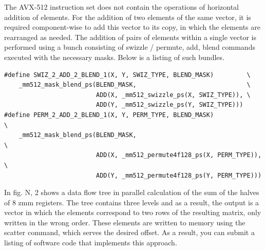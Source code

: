 \documentclass[
11pt,%
tightenlines,%
twoside,%
onecolumn,%
nofloats,%
nobibnotes,%
nofootinbib,%
superscriptaddress,%
noshowpacs,%
centertags]%
{revtex4}
\begin{document}
The AVX-512 instruction set does not contain the operations of horizontal addition of elements. For the addition of two elements of the same vector, it is required component-wise to add this vector to its copy, in which the elements are rearranged as needed. The addition of pairs of elements within a single vector is performed using a bunch consisting of swizzle / permute, add, blend commands executed with the necessary masks. Below is a listing of such bundles.

\begin{lstlisting}
#define SWIZ_2_ADD_2_BLEND_1(X, Y, SWIZ_TYPE, BLEND_MASK)         \
    _mm512_mask_blend_ps(BLEND_MASK,                              \
                         ADD(X, _mm512_swizzle_ps(X, SWIZ_TYPE)), \
                         ADD(Y, _mm512_swizzle_ps(Y, SWIZ_TYPE)))
#define PERM_2_ADD_2_BLEND_1(X, Y, PERM_TYPE, BLEND_MASK)              \
    _mm512_mask_blend_ps(BLEND_MASK,                                   \
                         ADD(X, _mm512_permute4f128_ps(X, PERM_TYPE)), \
                         ADD(Y, _mm512_permute4f128_ps(Y, PERM_TYPE)))

\end{lstlisting}

In fig. N, 2 shows a data flow tree in parallel calculation of the sum of the halves of 8 zmm registers. The tree contains three levels and as a result, the output is a vector in which the elements correspond to two rows of the resulting matrix, only written in the wrong order. These elements are written to memory using the scatter command, which serves the desired offset. As a result, you can submit a listing of software code that implements this approach.
\end{document}

